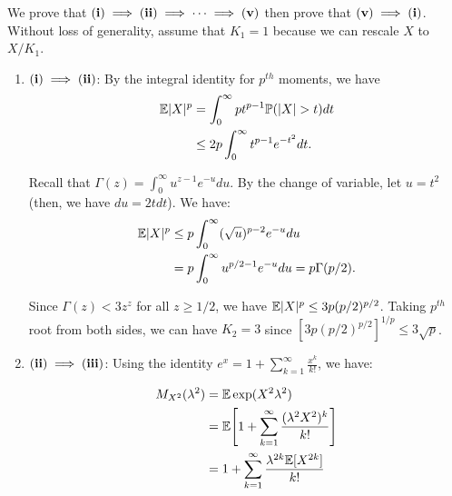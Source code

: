\begin{proof*}
	We prove that ${\bf (i)}\implies{\bf (ii)}\implies\dots\implies{\bf (v)}$ then prove that ${\bf (v)}\implies{\bf (i)}$. Without loss of generality, assume that $K_1=1$ because we can rescale $X$ to $X/K_1$.
	\begin{enumerate}
		\item ${\bf (i)}\implies{\bf (ii)}$: By the integral identity for $p^{th}$ moments, we have
		\begin{align*}
			\E|X|^p &= \int_0^\infty pt^{p-1}\Pm(|X|>t)dt \\
				&\le 2p\int_0^\infty t^{p-1}e^{-t^2}dt.
		\end{align*}

		\noindent Recall that $\Gamma(z) = \int_0^\infty u^{z-1}e^{-u}du$. By the change of variable, let $u=t^2$ (then, we have $du = 2tdt$). We have:
		\begin{align*}
			\mathbb{E}|X|^p &\le p\int_0^\infty (\sqrt{u})^{p-2}e^{-u}du \\
				&= p\int_0^\infty u^{p/2 - 1}e^{-u}du = p\Gamma(p/2).
		\end{align*} 

		\noindent Since $\Gamma(z) < 3z^z$ for all $z\ge 1/2$, we have $\mathbb{E}|X|^p \le 3p(p/2)^{p/2}$. Taking $p^{th}$ root from both sides, we can have $K_2=3$ since $[3p(p/2)^{p/2}]^{1/p} \le 3\sqrt{p}$.

		\item ${\bf (ii)}\implies{\bf (iii)}$: Using the identity $e^x = 1 + \sum_{k=1}^\infty \frac{x^k}{k!}$, we have:

		\begin{align*}
			M_{X^2}(\lambda^2) &= \mathbb{E}\exp(X^2\lambda^2) \\
				&= \mathbb{E}\Bigg[ 
					1 + \sum_{k=1}^\infty \frac{(\lambda^2X^2)^k}{k!}
				 \Bigg] \\
				&= 1 + \sum_{k=1}^\infty \frac{\lambda^{2k} \mathbb{E}[X^{2k}]}{k!}
		\end{align*} 
	\end{enumerate} 
\end{proof*} 
